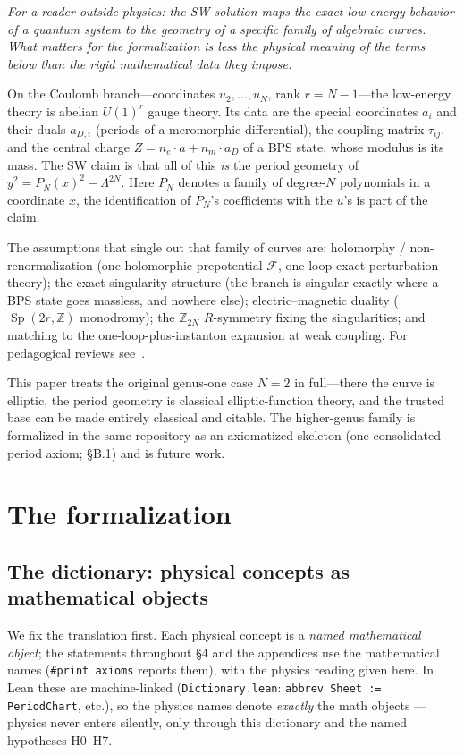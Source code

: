 \documentclass{article}
\theoremstyle{plain}
\theoremstyle{definition}
\numberwithin{equation}{section}
\newcommand{\Z}{\mathbb{Z}}
\newcommand{\Sp}{\operatorname{Sp}}
\newcommand{\code}[1]{\texttt{#1}}
\begin{document}
\emph{For a reader outside physics: the SW solution maps the exact low-energy behavior of a
quantum system to the geometry of a specific family of algebraic curves. What matters for the
formalization is less the physical meaning of the terms below than the rigid mathematical data
they impose.}

On the Coulomb branch---coordinates $u_2,\dots,u_N$, rank $r = N-1$---the low-energy theory is
abelian $U(1)^r$ gauge theory. Its data are the special coordinates $a_i$ and their duals
$a_{D,i}$ (periods of a meromorphic differential), the coupling matrix $\tau_{ij}$, and the
central charge $Z = n_e\cdot a + n_m\cdot a_D$ of a BPS state, whose modulus is its mass. The
SW claim is that all of this \emph{is} the period geometry of $y^2 = P_N(x)^2 - \Lambda^{2N}$.
Here $P_N$ denotes a family of degree-$N$ polynomials in a coordinate $x$,
the identification of $P_N$'s coefficients with the $u$'s is part of the claim.

The assumptions that single out that family of curves are: holomorphy / non-renormalization (one holomorphic
prepotential $\mathcal{F}$, one-loop-exact perturbation theory); the exact singularity
structure (the branch is singular exactly where a BPS state goes massless, and nowhere else);
electric--magnetic duality ($\Sp(2r,\Z)$ monodromy); the $\Z_{2N}$ $R$-symmetry fixing the
singularities; and matching to the one-loop-plus-instanton expansion at weak coupling.
For pedagogical reviews see~\cite{Lerche1997,Bilal1996}.

This paper treats the original genus-one case $N = 2$ in full---there the curve is elliptic,
the period geometry is classical elliptic-function theory, and the trusted base can be made
entirely classical and citable. The higher-genus family is formalized in the same repository
as an axiomatized skeleton (one consolidated period axiom; \S B.1) and is future work.

\section{The formalization}

\subsection{The dictionary: physical concepts as mathematical objects}

We fix the translation first. Each physical concept is a \emph{named mathematical object}; the
statements throughout \S4 and the appendices use the mathematical names (\code{\#print axioms}
reports them), with the physics reading given here. In Lean these are machine-linked
(\code{Dictionary.lean}: \code{abbrev Sheet := PeriodChart}, etc.), so the physics names denote
\emph{exactly} the math objects --- physics never enters silently, only through this dictionary and
the named hypotheses H0--H7.
\end{document}
